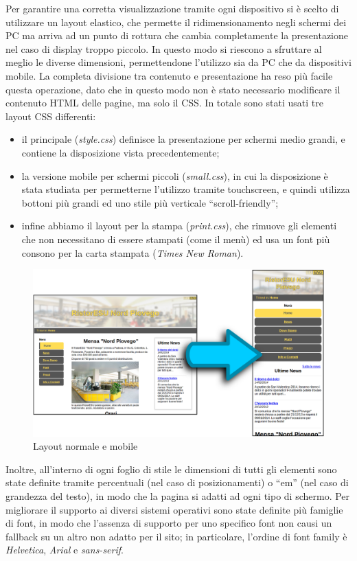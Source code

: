 \documentclass[10pt,a4paper,onecolumn]{article}
\begin{document}
Per garantire una corretta visualizzazione tramite ogni dispositivo si è scelto di utilizzare un layout elastico, che permette il ridimensionamento negli schermi dei PC ma arriva ad un punto di rottura che cambia completamente la presentazione nel caso di display troppo piccolo. In questo modo si riescono a sfruttare al meglio le diverse dimensioni, permettendone l'utilizzo sia da PC che da dispositivi mobile.
La completa divisione tra contenuto e presentazione ha reso più facile questa operazione, dato che in questo modo non è stato necessario modificare il contenuto HTML delle pagine, ma solo il CSS.
In totale sono stati usati tre layout CSS differenti:
\begin{itemize}
 \item il principale (\textit{style.css}) definisce la presentazione per schermi medio grandi, e contiene la disposizione vista precedentemente;
 \item la versione mobile per schermi piccoli (\textit{small.css}), in cui la disposizione è stata studiata per permetterne l'utilizzo tramite touchscreen, e quindi utilizza  bottoni più grandi ed uno stile più verticale ``scroll-friendly'';
 \item infine abbiamo il layout per la stampa (\textit{print.css}), che rimuove gli elementi che non necessitano di essere stampati (come il menù) ed usa un font più consono per la carta stampata (\textit{Times New Roman}).
\end{itemize}

\begin{figure}[h]
\centering
\includegraphics[scale=0.20]{trasformazione}
\caption{Layout normale e mobile}
\label{trasformazioneMobile}
\end{figure}

Inoltre, all'interno di ogni foglio di stile le dimensioni di tutti gli elementi sono state definite tramite percentuali (nel caso di posizionamenti) o ``em'' (nel caso di grandezza del testo), in modo che la pagina si adatti ad ogni tipo di schermo.
Per migliorare il supporto ai diversi sistemi operativi sono state definite più famiglie di font, in modo che l'assenza di supporto per uno specifico font non causi un fallback su un altro non adatto per il sito; in particolare, l'ordine di font family è \textit{Helvetica}, \textit{Arial} e \textit{sans-serif}.
\end{document}
